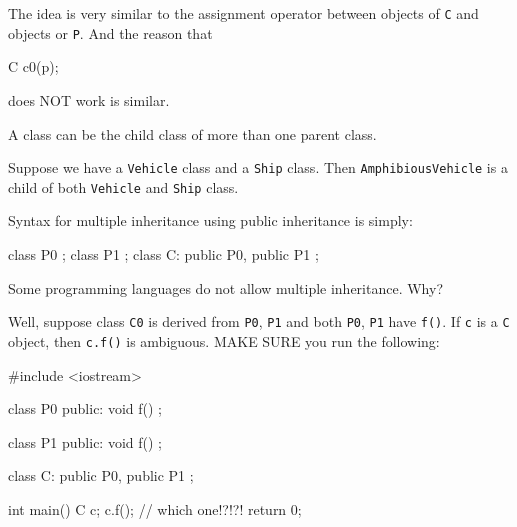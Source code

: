 The idea is very similar to the assignment operator between objects of
\verb!C! and objects or \verb!P!. And the reason that
\begin{console}
C c0(p);
\end{console}

does NOT work is similar.

\newpage{}

A class can be the child class of more than one parent class.

Suppose we have a \verb!Vehicle! class and a \verb!Ship! class. Then \verb!AmphibiousVehicle! is a child of both \verb!Vehicle! and \verb!Ship! class.

Syntax for multiple inheritance using public inheritance is simply:

\begin{console}
class P0 {};
class P1 {};
class C: public P0, public P1 {}; 
\end{console}

Some programming languages do not allow multiple inheritance. Why?

Well, suppose class \verb!C0! is derived from \verb!P0!, \verb!P1! and both \verb!P0!, \verb!P1! have \verb!f()!. If \verb!c! is a \verb!C! object, then \verb!c.f()! is ambiguous. MAKE SURE you run the following:
\begin{console}
#include <iostream>

class P0
{
public:
        void f() {}
};

class P1
{
public:
        void f() {}
};

class C: public P0, public P1
{};

int main()
{   
    C c;
    c.f(); // which one!?!?!
    return 0;
}
\end{console}

